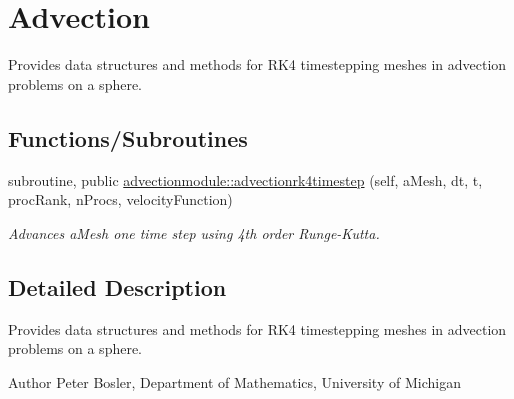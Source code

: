 \hypertarget{group___advection_r_k4}{\section{Advection}
\label{group___advection_r_k4}
}


Provides data structures and methods for R\+K4 timestepping meshes in advection problems on a sphere.  


\subsection*{Functions/\+Subroutines}
\begin{DoxyCompactItemize}
\item 
subroutine, public \hyperlink{group___advection_r_k4_ga9a42b57d9bea0b541418b2bb32ae1ba1}{advectionmodule\+::advectionrk4timestep} (self, a\+Mesh, dt, t, proc\+Rank, n\+Procs, velocity\+Function)
\begin{DoxyCompactList}\small\item\em Advances a\+Mesh one time step using 4th order Runge-\/\+Kutta. \end{DoxyCompactList}\end{DoxyCompactItemize}


\subsection{Detailed Description}
Provides data structures and methods for R\+K4 timestepping meshes in advection problems on a sphere. 

\begin{DoxyAuthor}{Author}
Peter Bosler, Department of Mathematics, University of Michigan 
\end{DoxyAuthor}


